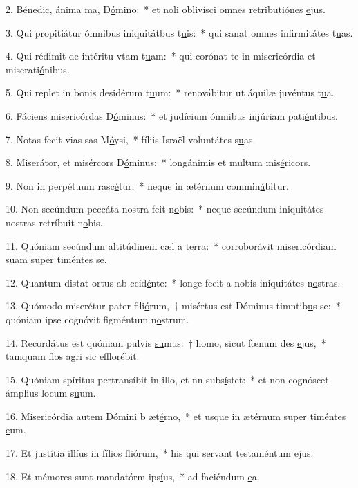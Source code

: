 2. Bénedic, ánima ma, D\uline{ó}mino:~* et noli oblivísci omnes retributiónes \uline{e}jus.\par 
3. Qui propitiátur ómnibus iniquitátbus t\uline{u}is:~* qui sanat omnes infirmitátes t\uline{u}as.\par 
4. Qui rédimit de intéritu vtam t\uline{u}am:~* qui corónat te in misericórdia et miserati\uline{ó}nibus.\par 
5. Qui replet in bonis desidérum t\uline{u}um:~* renovábitur ut áquilæ juvéntus t\uline{u}a.\par 
6. Fáciens misericórdas D\uline{ó}minus:~* et judícium ómnibus injúriam pati\uline{é}ntibus.\par 
7. Notas fecit vias sas M\uline{ó}ysi,~* fíliis Israël voluntátes s\uline{u}as.\par 
8. Miserátor, et misércors D\uline{ó}minus:~* longánimis et multum mis\uline{é}ricors.\par 
9. Non in perpétuum rasc\uline{é}tur:~* neque in ætérnum commin\uline{á}bitur.\par 
10. Non secúndum peccáta nostra fcit n\uline{o}bis:~* neque secúndum iniquitátes nostras retríbuit n\uline{o}bis.\par 
11. Quóniam secúndum altitúdinem cæl a t\uline{e}rra:~* corroborávit misericórdiam suam super tim\uline{é}ntes se.\par 
12. Quantum distat ortus ab ccid\uline{é}nte:~* longe fecit a nobis iniquitátes n\uline{o}stras.\par 
13. Quómodo miserétur pater fili\uline{ó}rum,~† misértus est Dóminus timntib\uline{u}s se:~* quóniam ipse cognóvit figméntum n\uline{o}strum.\par 
14. Recordátus est quóniam pulvis \uline{su}mus:~† homo, sicut fœnum des \uline{e}jus,~* tamquam flos agri sic efflor\uline{é}bit.\par 
15. Quóniam spíritus pertransíbit in illo, et nn subs\uline{í}stet:~* et non cognóscet ámplius locum s\uline{u}um.\par 
16. Misericórdia autem Dómini b æt\uline{é}rno,~* et usque in ætérnum super timéntes \uline{e}um.\par 
17. Et justítia illíus in fílios fli\uline{ó}rum,~* his qui servant testaméntum \uline{e}jus.\par 
18. Et mémores sunt mandatórm ips\uline{í}us,~* ad faciéndum \uline{e}a.\par 
